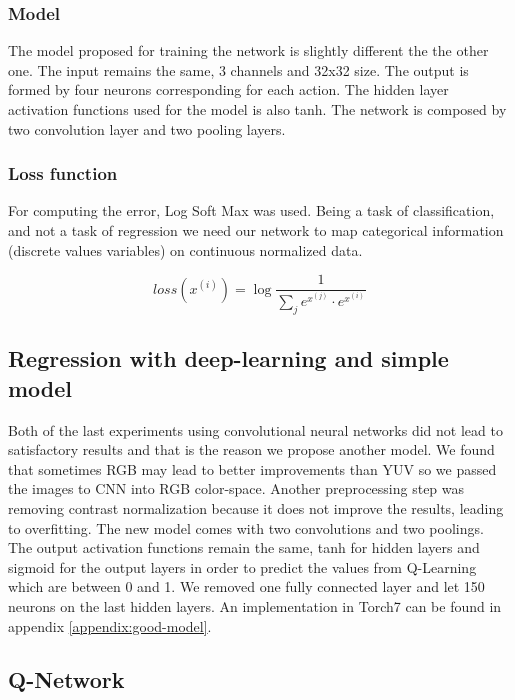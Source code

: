 \subsubsection{Model}
The model proposed for training the network is slightly different the the other one. The input remains the same, 3 channels and 32x32 size. The output is formed by four neurons corresponding for each action. The hidden layer activation functions used for the model is also tanh. The network is composed by two convolution layer and two pooling layers.

\subsubsection{Loss function}
For computing the error, Log Soft Max was used. Being a task of classification, and not a task of regression we need our network to map categorical information (discrete values variables) on continuous normalized data.

\begin{equation}
loss(x^{(i)}) = \log {\frac{1}{\displaystyle\sum_{j} e^{x^{(j)}}\cdot e^{x^{(i)}}}}
\end{equation}

\subsection{Regression with deep-learning and simple model}


Both of the last experiments using convolutional neural networks did not lead to satisfactory results and that is the reason we propose another model. We found that sometimes RGB may lead to better improvements than YUV\cite{pipeline} so we passed the images to CNN into RGB color-space. Another preprocessing step was removing contrast normalization because it does not improve the results, leading to overfitting. The new model comes with two convolutions and two poolings. The output activation functions remain the same, tanh for hidden layers and sigmoid for the output layers in order to predict the values from Q-Learning which are between 0 and 1. We removed one fully connected layer and let 150 neurons on the last hidden layers. An implementation in Torch7 can be found in appendix \ref{appendix:good-model}.

\subsection{Q-Network}

